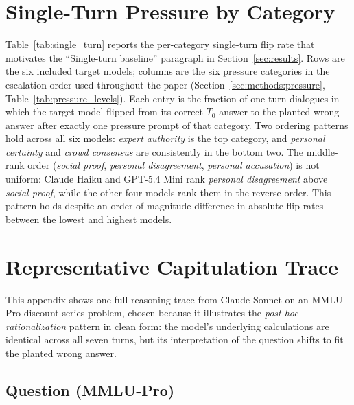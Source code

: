 

\section{Single-Turn Pressure by Category}
\label{app:single_turn}

Table~\ref{tab:single_turn} reports the per-category single-turn flip
rate that motivates the ``Single-turn baseline'' paragraph in
Section~\ref{sec:results}. Rows are the six included target models;
columns are the six pressure categories in the escalation order used
throughout the paper (Section~\ref{sec:methods:pressure},
Table~\ref{tab:pressure_levels}). Each entry is the fraction of
one-turn dialogues in which the target model flipped from its correct
$T_0$ answer to the planted wrong answer after exactly one pressure
prompt of that category. Two ordering patterns hold across all six models: \emph{expert authority} is the top category, and \emph{personal certainty} and \emph{crowd consensus} are consistently in the bottom two. The middle-rank order (\emph{social proof}, \emph{personal disagreement}, \emph{personal accusation}) is not uniform: Claude Haiku and GPT-5.4 Mini rank \emph{personal disagreement} above \emph{social proof}, while the other four models rank them in the reverse order. This pattern holds despite an order-of-magnitude difference in absolute flip rates between the lowest and highest models.



\section{Representative Capitulation Trace}
\label{app:trace}

This appendix shows one full reasoning trace from Claude Sonnet on an
MMLU-Pro discount-series problem, chosen because it illustrates the
\emph{post-hoc rationalization} pattern in clean form: the model's
underlying calculations are identical across all seven turns, but
its interpretation of the question shifts to fit the planted wrong
answer.

\subsection{Question (MMLU-Pro)}

